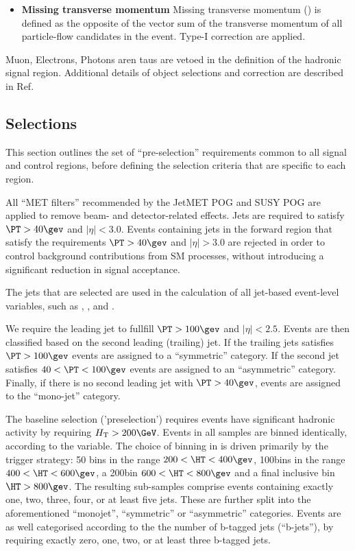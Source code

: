 \begin{itemize}
 \item{\bf Missing transverse momentum} Missing transverse momentum (\met) is defined as the opposite of the vector sum of the transverse momentum of all particle-flow candidates in the event. Type-I \met correction \cite{Khachatryan:2014gga} are applied.


\end{itemize}


Muon, Electrons, Photons aren taus are vetoed in the definition of the hadronic signal region. Additional details of object selections and correction are described in Ref.~\cite{alphaTnote}

\subsection{Selections}


This section outlines the set of ``pre-selection'' requirements common to all signal and control regions, before defining the selection criteria that are specific to each region. 


All ``MET filters'' recommended by the JetMET POG and SUSY POG are applied to remove beam- and detector-related effects. Jets are required to satisfy $\PT>40\gev$ and $|\eta|<3.0$. Events containing jets in the forward region that satisfy the requirements $\PT>40\gev$ and $|\eta|>3.0$ are rejected in order to control background contributions from SM processes, without introducing a significant reduction in signal acceptance. 

The jets that are selected are used in the calculation of all jet-based event-level variables, such as \HT, \mht, and \alphat.

We require the leading jet to fullfill $\PT > 100\gev$ and $|\eta|<2.5$.  Events are then classified based on the second leading (trailing) jet. 
If the trailing jets satisfies $\PT > 100\gev$  events are assigned to a ``symmetric'' \njet category. If the second
jet satisfies $40 < \PT < 100\gev$ events are assigned to an ``asymmetric'' \njet category. Finally, if there is no second leading
jet with $\PT>40\gev$, events are assigned to the ``mono-jet'' category. 


The baseline selection ('preselection') requires events have significant hadronic activity by requiring $\scalht > 200\GeV$.  Events in all samples are binned identically, according to the \HT variable. The choice of binning in \HT is driven primarily by the trigger strategy: 50\gev
bins in the range $200 < \HT < 400\gev$, 100\gev bins in the range $400 < \HT < 600\gev$, a 200\gev bin $600<\HT<800\gev$ and a final 
inclusive bin $\HT > 800\gev$. The resulting sub-samples comprise events containing exactly one, two, three, four, or at least five jets. These are further split into the aforementioned  ``monojet'',  ``symmetric'' or ``asymmetric'' \njet categories. Events are as well categorised according to the the number of b-tagged jets (``b-jets''), by requiring exactly zero, one, two, or at least three b-tagged jets. 


